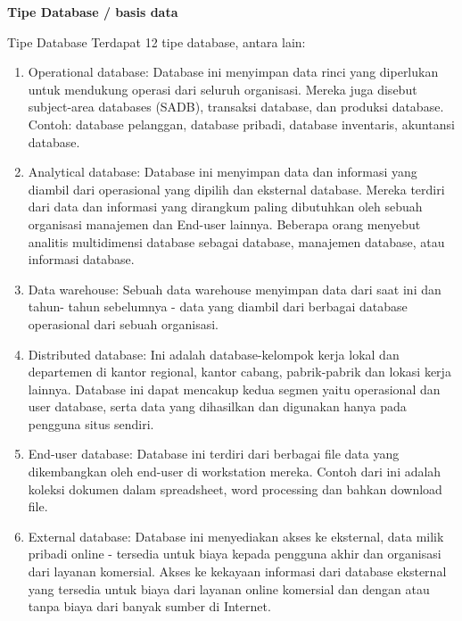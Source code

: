  \par
\vspace{12pt}
\noindent 
\textbf{Tipe Database / basis data} \par
\noindent 
Tipe Database Terdapat 12 tipe database, antara lain: \par
\noindent 
\begin{enumerate}
\item Operational database: Database ini menyimpan data rinci yang diperlukan untuk mendukung operasi dari seluruh organisasi. Mereka juga disebut subject-area databases (SADB), transaksi database, dan produksi database. Contoh: database pelanggan, database pribadi, database inventaris, akuntansi database. \par
\noindent 
\item Analytical database: Database ini menyimpan data dan informasi yang diambil dari operasional yang dipilih dan eksternal database. Mereka terdiri dari data dan informasi yang dirangkum paling dibutuhkan oleh sebuah organisasi manajemen dan End-user lainnya. Beberapa orang menyebut analitis multidimensi database sebagai database, manajemen database, atau informasi database. \par
\noindent 
\item Data warehouse: Sebuah data warehouse menyimpan data dari saat ini dan tahun- tahun sebelumnya - data yang diambil dari berbagai database operasional dari sebuah organisasi. \par
\noindent 
\item Distributed database: Ini adalah database-kelompok kerja lokal dan departemen di kantor regional, kantor cabang, pabrik-pabrik dan lokasi kerja lainnya. Database ini dapat mencakup kedua segmen yaitu operasional dan user database, serta data yang dihasilkan dan digunakan hanya pada pengguna situs sendiri. \par
\noindent 
\item End-user database: Database ini terdiri dari berbagai file data yang dikembangkan oleh end-user di workstation mereka. Contoh dari ini adalah koleksi dokumen dalam spreadsheet, word processing dan bahkan download file. \par
\noindent 
\item External database: Database ini menyediakan akses ke eksternal, data milik pribadi online - tersedia untuk biaya kepada pengguna akhir dan organisasi dari layanan komersial. Akses ke kekayaan informasi dari database eksternal yang tersedia untuk biaya dari layanan online komersial dan dengan atau tanpa biaya dari banyak sumber di Internet. \par

\end{enumerate}
